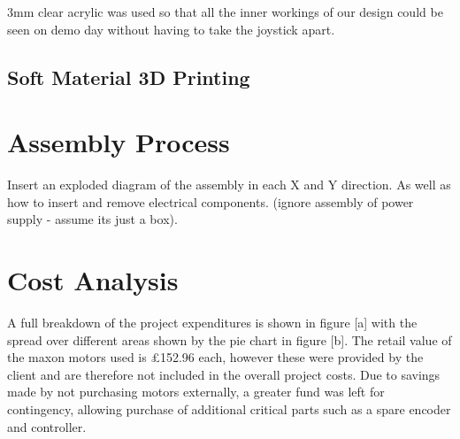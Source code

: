 3mm clear acrylic was used so that all the inner workings of our design could be seen on demo day without having to take the joystick apart.

\begin{figure}

\end{figure}


\subsection{Soft Material 3D Printing} %
\label{sub:soft_material_3d_printing}





\section{Assembly Process} %
\label{sec:assembly_process}

Insert an exploded diagram of the assembly in each X and Y direction. As well as how to insert and remove electrical components. (ignore assembly of power supply - assume its just a box).



\section{Cost Analysis} %
\label{sec:cost_analysis}

A full breakdown of the project expenditures is shown in figure [a] with the spread over different areas shown by the pie chart in figure [b]. The retail value of the maxon motors used is £152.96 each, however these were provided by the client and are therefore not included in the overall project costs.  Due to savings made by not purchasing motors externally, a greater fund was left for contingency, allowing purchase of additional critical parts such as a spare encoder and controller.


